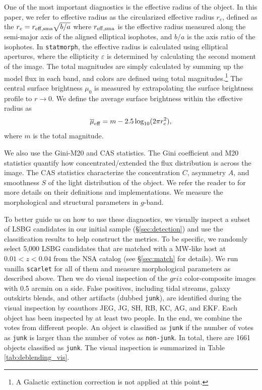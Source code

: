 \documentclass[twocolumn,astrosymb,twocolappendix]{aastex631}
\newcommand{\code}[1]{\texttt{#1}}
\begin{document}
\begin{CJK*}{UTF8}{gbsn}
One of the most important diagnostics is the effective radius of the object. In this paper, we refer to effective radius as the circularized effective radius $r_{e}$, defined as the $r_{e} = r_{\rm eff, sma} \sqrt{b/a}$ where $r_{\rm eff, sma}$ is the effective radius measured along the semi-major axis of the aligned elliptical isophotes, and $b/a$ is the axis ratio of the isophotes. In \code{statmorph}, the effective radius is calculated using elliptical apertures, where the ellipticity $\varepsilon$ is determined by calculating the second moment of the image. The total magnitudes are simply calculated by summing up the model flux in each band, and colors are defined using total magnitudes.\footnote{A Galactic extinction correction is not applied at this point.} The central surface brightness $\mu_0$ is measured by extrapolating the surface brightness profile to $r\to 0$. We define the average surface brightness within the effective radius as 
\begin{equation}\label{eq:mu_eff}
    \overline{\mu}_{\rm eff} = m - 2.5 \log_{10}(2 \pi r_e^2),
\end{equation}
where $m$ is the total magnitude. 

We also use the Gini-M20 and CAS statistics. The Gini coefficient and M20 statistics \citep{Abraham2003,Lotz2004} quantify how concentrated/extended the flux distribution is across the image. The CAS statistics characterize the concentration $C$, asymmetry $A$, and smoothness $S$ of the light distribution of the object. We refer the reader to \citet{statmorph} for more details on their definitions and implementations. We measure the morphological and structural parameters in $g$-band.



To better guide us on how to use these diagnostics, we visually inspect a subset of LSBG candidates in our initial sample (\S \ref{sec:detection}) and use the classification results to help construct the metrics. To be specific, we randomly select 5,000 LSBG candidates that are matched with a MW-like host at $0.01 < z < 0.04$ from the NSA catalog (see \S\ref{sec:match} for details). We run vanilla \code{scarlet} for all of them and measure morphological parameters as described above. Then we do visual inspection of the $griz$ color-composite images with 0.5 arcmin on a side. False positives, including tidal streams, galaxy outskirts blends, and other artifacts (dubbed \code{junk}), are identified during the visual inspection by coauthors JEG, JG, SH, RB, KC, AG, and EKF. Each object has been inspected by at least two people. In the end, we combine the votes from different people. An object is classified as \code{junk} if the number of votes as \code{junk} is larger than the number of votes as \code{non-junk}. In total, there are 1661 objects classified as \code{junk}. The visual inspection is summarized in Table \ref{tab:deblending_vis}.



\end{CJK*}
\end{document}
